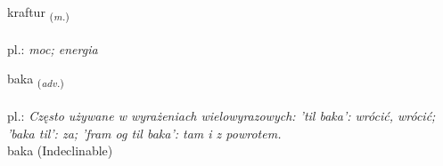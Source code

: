 \documentclass[frontgrid, backgrid]{flacards}\usepackage[]{graphicx}\usepackage[]{xcolor}
\begin{document}
\renewcommand{\flhead}{\vskip5pt \fboxsep=0pt {\small\bfseries\footnotesize Nafnorð | Noun}}
\renewcommand{\fcfoot}{\vskip5pt \fboxsep=0pt \hspace{2pt}{\small\bfseries\footnotesize 1K}}

\renewcommand{\blhead}{\vskip5pt {\small\bfseries\footnotesize Nafnorð | Noun }}
\renewcommand{\bcfoot}{\vskip5pt \hspace{2pt}{\small\bfseries\footnotesize 1K}}


{kraftur \small{\textsubscript{(\textit{m.})}} \\[1ex] %
\textphonetic{[kʰraftʏr]} \\
pl.: \emph{moc; energia} \\  [2ex]
\renewcommand*{\arraystretch}{0.8}
}


\renewcommand{\flhead}{\vskip5pt \fboxsep=0pt {\small\bfseries\footnotesize Atviksorð | Adverb}}
\renewcommand{\fcfoot}{\vskip5pt \fboxsep=0pt \hspace{2pt}{\small\bfseries\footnotesize 1K}}

\renewcommand{\blhead}{\vskip5pt {\small\bfseries\footnotesize Atviksorð | Adverb }}
\renewcommand{\bcfoot}{\vskip5pt \hspace{2pt}{\small\bfseries\footnotesize 1K}}


{baka \small{\textsubscript{(\textit{adv.})}} \\[1ex]
\textphonetic{[paːka]} \\
pl.: \emph{Często używane w wyrażeniach wielowyrazowych: 'til baka': wrócić, wrócić; 'baka til': za; 'fram og til baka': tam i z powrotem.} \\  [2ex]
baka (Indeclinable)}
\end{document}
